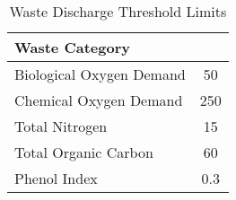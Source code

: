 \begin{table}[h]
\centering
\caption{Waste Discharge Threshold Limits }
\label{tab:waste}
\begin{tabular}{lS[table-format=3.1]}
\toprule
Waste Category & {} \\ \midrule
Biological Oxygen Demand           & 50                                                                                             \\
Chemical Oxygen Demand             & 250                                                                                            \\
Total Nitrogen                     & 15                                                                                             \\
Total Organic Carbon               & 60                                                                                             \\
Phenol Index                       & 0.3                                                                                            \\ \bottomrule
\end{tabular}
\end{table}

